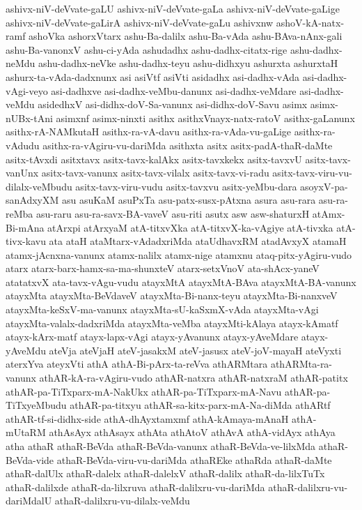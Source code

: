 {ashivx-niV-deVvate-gaLU
ashivx-niV-deVvate-gaLa
ashivx-niV-deVvate-gaLige
ashivx-niV-deVvate-gaLirA
ashivx-niV-deVvate-gaLu
ashivxnw
ashoV-kA-natx-ramf
ashoVka
ashorxVtarx
ashu-Ba-dalilx
ashu-Ba-vAda
ashu-BAva-nAnx-gali
ashu-Ba-vanonxV
ashu-ci-yAda
ashudadhx
ashu-dadhx-citatx-rige
ashu-dadhx-neMdu
ashu-dadhx-neVke
ashu-dadhx-teyu
ashu-didhxyu
ashurxta
ashurxtaH
ashurx-ta-vAda-dadxnunx
asi
asiVtf
asiVti
asidadhx
asi-dadhx-vAda
asi-dadhx-vAgi-veyo
asi-dadhxve
asi-dadhx-veMbu-danunx
asi-dadhx-veMdare
asi-dadhx-veMdu
asidedhxV
asi-didhx-doV-Sa-vanunx
asi-didhx-doV-Savu
asimx
asimx-nUBx-tAni
asimxnf
asimx-ninxti
asithx
asithxVnayx-natx-ratoV
asithx-gaLanunx
asithx-rA-NAMkutaH
asithx-ra-vA-davu
asithx-ra-vAda-vu-gaLige
asithx-ra-vAdudu
asithx-ra-vAgiru-vu-dariMda
asithxta
asitx
asitx-padA-thaR-daMte
asitx-tAvxdi
asitxtavx
asitx-tavx-kalAkx
asitx-tavxkekx
asitx-tavxvU
asitx-tavx-vanUnx
asitx-tavx-vanunx
asitx-tavx-vilalx
asitx-tavx-vi-radu
asitx-tavx-viru-vu-dilalx-veMbudu
asitx-tavx-viru-vudu
asitx-tavxvu
asitx-yeMbu-dara
asoyxV-pa-sanAdxyXM
asu
asuKaM
asuPxTa
asu-patx-susx-pAtxna
asura
asu-rara
asu-ra-reMba
asu-raru
asu-ra-savx-BA-vaveV
asu-riti
asutx
asw
asw-shaturxH
atAmx-Bi-mAna
atArxpi
atArxyaM
atA-titxvXka
atA-titxvX-ka-vAgiye
atA-tivxka
atA-tivx-kavu
ata
ataH
ataMtarx-vAdadxriMda
ataUdhavxRM
atadAvxyX
atamaH
atamx-jAcnxna-vanunx
atamx-nalilx
atamx-nige
atamxnu
ataq-pitx-yAgiru-vudo
atarx
atarx-barx-hamx-sa-ma-shunxteV
atarx-setxVnoV
ata-shAcx-yaneV
atatatxvX
ata-tavx-vAgu-vudu
atayxMtA
atayxMtA-BAva
atayxMtA-BA-vanunx
atayxMta
atayxMta-BeVdaveV
atayxMta-Bi-nanx-teyu
atayxMta-Bi-nanxveV
atayxMta-keSxV-ma-vanunx
atayxMta-sU-kaSxmX-vAda
atayxMta-vAgi
atayxMta-valalx-dadxriMda
atayxMta-veMba
atayxMti-kAlaya
atayx-kAmatf
atayx-kArx-matf
atayx-lapx-vAgi
atayx-yAvanunx
atayx-yAveMdare
atayx-yAveMdu
ateVja
ateVjaH
ateV-jasakxM
ateV-jasusx
ateV-joV-mayaH
ateVyxti
aterxYva
ateyxVti
athA
athA-Bi-pArx-ta-reVva
athARMtara
athARMta-ra-vanunx
athAR-kA-ra-vAgiru-vudo
athAR-natxra
athAR-natxraM
athAR-patitx
athAR-pa-TiTxparx-mA-NakUkx
athAR-pa-TiTxparx-mA-Navu
athAR-pa-TiTxyeMbudu
athAR-pa-titxyu
athAR-sa-kitx-parx-mA-Na-diMda
athARtf
athAR-tf-si-didhx-side
athA-dhAyxtamxmf
athA-kAmaya-mAnaH
athA-mUtaRM
athAsAyx
athAsayx
athAta
athAtoV
athAvA
athA-vidAyx
athAya
atha
athaR
athaR-BeVda
athaR-BeVda-vanunx
athaR-BeVda-ve-lilxMda
athaR-BeVda-vide
athaR-BeVda-viru-vu-dariMda
athaREke
athaRda
athaR-daMte
athaR-dalUlx
athaR-dalelx
athaR-dalelxV
athaR-dalilx
athaR-da-lilxTuTx
athaR-dalilxde
athaR-da-lilxruva
athaR-dalilxru-vu-dariMda
athaR-dalilxru-vu-dariMdalU
athaR-dalilxru-vu-dilalx-veMdu
}
